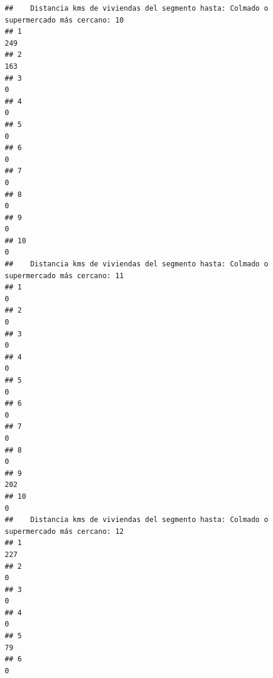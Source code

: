\documentclass[11pt,]{article}
\begin{document}
\begin{verbatim}
##    Distancia kms de viviendas del segmento hasta: Colmado o supermercado más cercano: 10
## 1                                                                                    249
## 2                                                                                    163
## 3                                                                                      0
## 4                                                                                      0
## 5                                                                                      0
## 6                                                                                      0
## 7                                                                                      0
## 8                                                                                      0
## 9                                                                                      0
## 10                                                                                     0
##    Distancia kms de viviendas del segmento hasta: Colmado o supermercado más cercano: 11
## 1                                                                                      0
## 2                                                                                      0
## 3                                                                                      0
## 4                                                                                      0
## 5                                                                                      0
## 6                                                                                      0
## 7                                                                                      0
## 8                                                                                      0
## 9                                                                                    202
## 10                                                                                     0
##    Distancia kms de viviendas del segmento hasta: Colmado o supermercado más cercano: 12
## 1                                                                                    227
## 2                                                                                      0
## 3                                                                                      0
## 4                                                                                      0
## 5                                                                                     79
## 6                                                                                      0

\end{verbatim}
\end{document}
